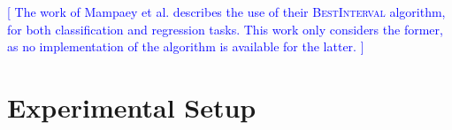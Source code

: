 \documentclass[smallextended]{svjour3}
\newcommand{\marvin}[1]{\textcolor{blue}{[#1]}}
\newcommand{\dimension}{\emph}
\newcommand{\parameter}{\emph}
\newcommand{\binaries}{\parameter{binaries}}
\newcommand{\nominal}{\parameter{nominal}}
\newcommand{\all}{\parameter{all}}
\newcommand{\best}{\parameter{best}}
\begin{document}
\marvin{
The work of Mampaey et al.\@ \cite{mampaey:2012,mampaey:2015} describes the use of their \textsc{BestInterval} algorithm, for both classification and regression tasks.
This work only considers the former, as no implementation of the algorithm is available for the latter.
}

\begin{comment}
Finally, a few notes about the use of the Mann-Whitney $U$ statistic.
First, this statistic is used only to compare mean ranks.
To compare medians, the distributions are required to have `similar' shape, and this is not the case more often than it is.

Also, different statistical packages offer different versions of the Mann-Whitney $U$ test \cite{bergman:2000}.
When computing the $z$-score for a result, this work applies both a tie-correction, and a continuity correction.

Further, the independence of observations assumption could be considered violated as the same subgroup can occur in both groups (rankings).
This could happen for some strategy comparisons, like those comparing the \all{} and \best{} variant of otherwise identical strategies.
On the other hand, it does not usually happen for strategies that differ in dimension \dimension{interval type}, as \binaries{} and \nominal{} produce very different descriptions.
But, this is under the assumption that observations refer to subgroup descriptions.
Under the interpretation that subgroup extensions should be considered observations, the assumption is probably broken more often, as multiple descriptions can refer to the same extension.

Nonetheless, the statistic is still used, and it seems a reasonable instrument, as the final conclusion will show that it produces the exact same ranking of strategies as a comparison based on mean scores.
\end{comment}





\section{Experimental Setup}
\label{section:experimental-setup}
\end{document}

